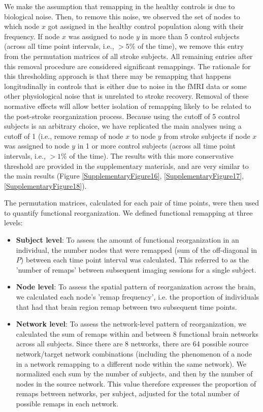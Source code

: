 \documentclass[phd,tocprelim]{cornell}
\begin{document}
	We make the assumption that remapping in the healthy controls is due to biological noise. Then, to remove this noise, we observed the set of nodes to which node $x$ got assigned in the healthy control population along with their frequency. If node $x$ was assigned to node $y$ in more than 5 control subjects (across all time point intervals, i.e., $> 5 \%$ of the time), we remove this entry from the permutation matrices of all stroke subjects. All remaining entries after this removal procedure are considered  significant remappings. The rationale for this thresholding approach is that there may be remapping that happens longitudinally in controls that is either due to noise in the fMRI data or some other physiological noise that is unrelated to stroke recovery. Removal of these normative effects will allow better isolation of remapping likely to be related to the post-stroke reorganization process. Because using the cutoff of 5 control subjects is an arbitrary choice, we have replicated the main analyses using a cutoff of 1 (i.e., remove remap of node $x$ to node $y$ from stroke subjects if node $x$ was assigned to node $y$ in 1 or more control subjects (across all time point intervals, i.e., $> 1 \%$ of the time). The results with this more conservative threshold are provided in the supplementary materials, and are very similar to the main results (Figure \ref{SupplementaryFigure16}, \ref{SupplementaryFigure17}, \ref{SupplementaryFigure18}).

	The permutation matrices, calculated for each pair of time points, were then used to quantify functional reorganization. We defined functional remapping at three levels:
	
	\begin{itemize}
	 \item \textbf{Subject level}: To assess the amount of functional reorganization in an individual, the number nodes that were remapped (sum of the off-diagonal in $P$) between each time point interval was calculated. This referred to as the 'number of remaps' between subsequent imaging sessions for a single subject.
	 
	 \item \textbf{Node level}: To assess the spatial pattern of reorganization across the brain, we calculated each node's 'remap frequency', i.e. the proportion of individuals that had that brain region remap between two subsequent time points.
	 
	 \item \textbf{Network level}: To assess the network-level pattern of reorganization, we calculated the sum of remaps within and between 8 functional brain networks across all subjects. Since there are 8 networks, there are 64 possible source network/target network combinations (including the phenomenon of a node in a network remapping to a different node within the same network). We normalized each sum by the number of subjects, and then by the number of nodes in the source network. This value therefore expresses the proportion of remaps between networks, per subject, adjusted for the total number of possible remaps in each network. 
	\end{itemize}
\end{document}
